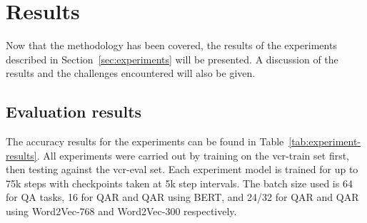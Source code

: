 \chapter{Results}
\label{chp:results}

Now that the methodology has been covered, the results of the experiments described in Section~\ref{sec:experiments} will be presented.
A discussion of the results and the challenges encountered will also be given.

\section{Evaluation results}
\label{sec:evaluation-results}

The accuracy results for the experiments can be found in Table~\ref{tab:experiment-results}.
All experiments were carried out by training on the vcr-train set first, then testing against the vcr-eval set.
Each experiment model is trained for up to 75k steps with checkpoints taken at 5k step intervals.
The batch size used is 64 for Q\rightarrow{}A tasks, 16 for QA\rightarrow{}R and Q\rightarrow{}AR using BERT, and 24/32 for QA\rightarrow{}R and Q\rightarrow{}AR using Word2Vec-768 and Word2Vec-300 respectively.

